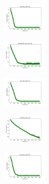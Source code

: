 \begin{figure}[H]
    \begin{subfigure}
        \centering
        \includegraphics[width=0.234\textwidth]{img/aggsf/rand_set_const_10_277451237_cost.png}
    \end{subfigure}
    \hfill
    \begin{subfigure}
        \centering
        \includegraphics[width=0.234\textwidth]{img/aggsf/newthyroid_set_const_10_277451237_cost.png}
    \end{subfigure}
    \hfill
    \begin{subfigure}
        \centering
        \includegraphics[width=0.234\textwidth]{img/aggsf/iris_set_const_10_49258669_cost.png}
    \end{subfigure}
    \hfill
    \begin{subfigure}
        \centering
        \includegraphics[width=0.234\textwidth]{img/aggsf/ecoli_set_const_10_49258669_cost.png}
    \end{subfigure}
    \hfill
    \begin{subfigure}
        \centering
        \includegraphics[width=0.234\textwidth]{img/aggsf/rand_set_const_10_49258669_cost.png}
    \end{subfigure}
    \hfill
    \begin{subfigure}
        \centering

\end{subfigure}
\end{figure}

